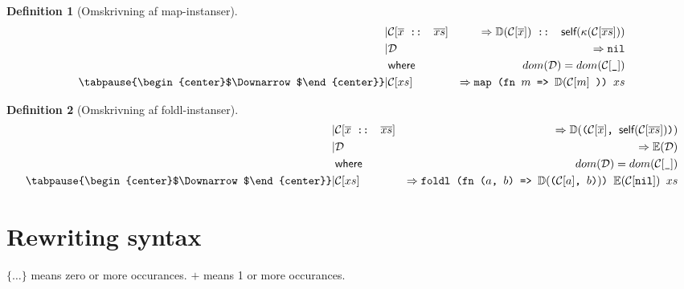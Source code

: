 \documentclass[oneside]{memoir}
\theoremstyle{definition}
\newtheorem{definition}{Definition}
\begin{document}
\begin{definition}[Omskrivning af \textsf{map}-instanser]

  \begin{eqnarray*}[rqrl]
    | & \mathcal{C}  [\overline{x} \texttt{ :: } \overline{xs}] &  => \mathbb{D}
    (\mathcal{C}[ \overline{x}]) \texttt{ :: } \textsf{self}(\kappa ( \mathcal{C}
    [ \overline{xs} ] ) ) \\
    | & \mathcal{D} & => \texttt{nil}\\
    & \textsf{where}\ \ & dom(\mathcal{D}) = dom(\mathcal{C}[\texttt{\_}])\\
   \tabpause{\begin{center}$\Downarrow$\end{center}}
    | & \mathcal{C} [ xs ] & => \texttt{map (fn $m$ => $\mathbb{D}(\mathcal{C} [ m ]$ )) $xs$}
  \end{eqnarray*}
\end{definition}

\begin{definition}[Omskrivning af \textsf{foldl}-instanser] \ \\

  \begin{eqnarray*}[rqrl]
    | & \mathcal{C}[\overline{x} \texttt{ :: } \overline{xs}] &  => \mathbb{D} ( \texttt{($\mathcal{C}
      [\overline{x}]$, $\textsf{self}( \mathcal{C}[\overline{xs}])$)} ) \\
    | & \mathcal{D} & => \mathbb{E}(\mathcal{D})\\
    & \textsf{where}\ \ & dom(\mathcal{D}) = dom(\mathcal{C}[\texttt{\_}])\\
    \tabpause{\begin{center}$\Downarrow$\end{center}}  
    | & \mathcal{C} [xs] & => \texttt{foldl (fn ($a$, $b$) => $\mathbb{D}($($\mathcal{C}[a]$, $b$)$)$) $\mathbb{E}(\mathcal{C}[\texttt{nil}])$ $xs$}
  \end{eqnarray*}

  
\end{definition}


\chapter{Rewriting syntax}

$\{ \ldots \}$ means zero or more occurances.
$+$ means 1 or more occurances.
\end{document}

